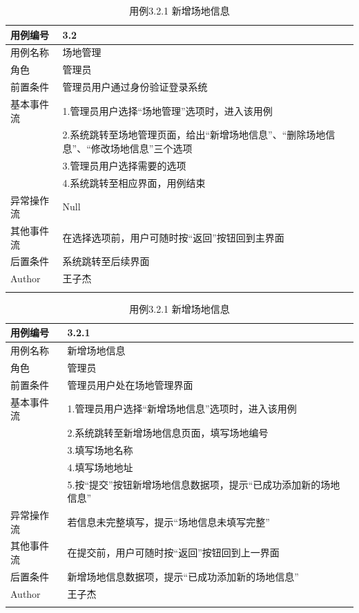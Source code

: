 \documentclass[a4paper,UTF8]{article}
\begin{document}
\begin{table}[H]
	\begin{center}
		\caption{用例3.2 场地管理}
		\label{table:Tab_uc32}
		\begin{tabular}{|p{}|p{}|}
			\hline\noalign{\smallskip}
			用例编号 & 3.2\\
			\hline
			用例名称 &  场地管理\\
			\hline
			角色 & 管理员\\
			\hline
			前置条件 & 管理员用户通过身份验证登录系统 \\
			\hline
			基本事件流 & 1.管理员用户选择“场地管理”选项时，进入该用例 \\& 2.系统跳转至场地管理页面，给出“新增场地信息”、“删除场地信息”、“修改场地信息”三个选项 \\& 3.管理员用户选择需要的选项 \\& 4.系统跳转至相应界面，用例结束\\
			\hline
			异常操作流 & Null \\
			\hline
			其他事件流 & 在选择选项前，用户可随时按“返回”按钮回到主界面 \\
			\hline
			后置条件 & 系统跳转至后续界面 \\
			\hline
			Author & 王子杰 \\
			\noalign{\smallskip}
			\hline
			\noalign{\smallskip}
		\end{tabular}
		\caption{用例3.2.1 新增场地信息}
		\label{table:Tab_uc321}
		\begin{tabular}{|p{}|p{}|}
			\hline\noalign{\smallskip}
			用例编号 & 3.2.1\\
			\hline
			用例名称 &  新增场地信息\\
			\hline
			角色 & 管理员\\
			\hline
			前置条件 & 管理员用户处在场地管理界面 \\
			\hline
			基本事件流 & 1.管理员用户选择“新增场地信息”选项时，进入该用例 \\& 2.系统跳转至新增场地信息页面，填写场地编号\\& 3.填写场地名称 \\& 4.填写场地地址 \\& 5.按“提交”按钮新增场地信息数据项，提示“已成功添加新的场地信息” \\
			\hline
			异常操作流 & 若信息未完整填写，提示“场地信息未填写完整” \\
			\hline
			其他事件流 & 在提交前，用户可随时按“返回”按钮回到上一界面 \\
			\hline
			后置条件 & 新增场地信息数据项，提示“已成功添加新的场地信息” \\
			\hline
			Author & 王子杰 \\
			\noalign{\smallskip}
			\hline
			\noalign{\smallskip}
		\end{tabular}
	\end{center}
\end{table}
\end{document}
